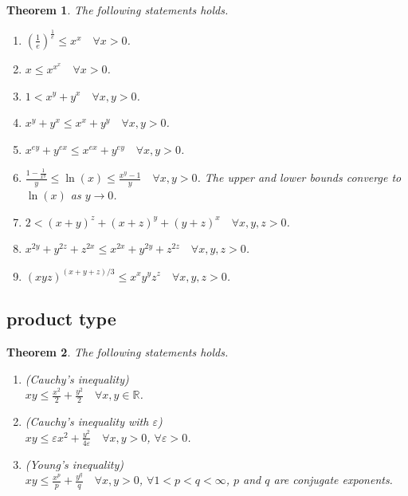 \documentclass[11pt,a4paper]{report}
\newtheorem{theorem}{Theorem}[section]
\theoremstyle{definition}
\begin{document}
\begin{theorem}
	The following statements holds.
	\begin{enumerate}[label=(\alph*)] 
		\rm\item $\displaystyle \left(\frac{1}{e}\right)^{\frac{1}{e}} \leq x^{x} \quad \forall x > 0$.
		\rm\item $\displaystyle x \leq x^{x^{x}} \quad \forall x > 0$.
		\rm\item $1 < x^{y}+y^{x}  \quad \forall x, y > 0$.
		\rm\item $x^{y}+y^{x} \leq x^{x}+y^{y} \quad \forall x, y > 0$.
		\rm\item $x^{e y}+y^{e x} \leq x^{e x}+y^{e y} \quad \forall x, y > 0$.
		\rm\item $\displaystyle \frac{1-\frac{1}{x^{y}}}{y} \leq \ln (x) \leq \frac{x^{y} - 1}{y} \quad \forall x, y > 0$. The upper and lower bounds converge to $\ln (x)$ as $y \rightarrow 0$.
		\rm\item $2 < (x+y)^{z}+(x+z)^{y}+(y+z)^{x} \quad \forall x, y, z > 0$.
		\rm\item $x^{2 y}+y^{2 z}+z^{2 x} \leq x^{2 x}+y^{2 y}+z^{2 z} \quad \forall x, y, z > 0$.
		\rm\item $(x y z)^{(x+y+z) / 3} \leq x^{x} y^{y} z^{z} \quad \forall x, y, z > 0$.
	\end{enumerate}
	
\end{theorem}

\subsection{product type}

\begin{theorem}
	The following statements holds.
	\begin{enumerate}[label=(\alph*)] 
		\rm\item (Cauchy's inequality) \\[0.1cm]
		$\displaystyle xy \leq \frac{x^{2}}{2}+\frac{y^{2}}{2} \quad \forall x, y \in \mathbb{R}$. 
		\rm\item (Cauchy's inequality with $\varepsilon$)\\[0.1cm]
		$\displaystyle xy \leq \varepsilon x^{2}+\frac{y^{2}}{4 \varepsilon} \quad \forall x, y>0$, $\forall \varepsilon>0$.
		\rm\item (Young's inequality)\\[0.1cm]
		$\displaystyle xy \leq \frac{x^p}{p} + \frac{y^q}{q} \quad \forall x, y>0$, $\forall 1 < p < q < \infty$, $p$ and $q$ are conjugate exponents.
	\end{enumerate}
\end{theorem}
\end{document}
